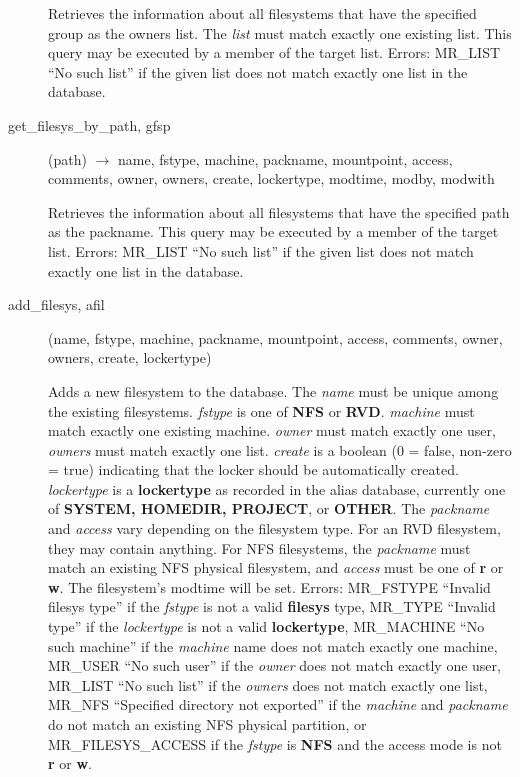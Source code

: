 \documentclass{article}
\begin{document}
\begin{description}
Retrieves the information about all filesystems that have the
specified group as the owners list.  The {\em list} must match exactly
one existing list.  This query may be executed by a member of the
target list.  Errors: MR\_LIST ``No such list'' if the given list does
not match exactly one list in the database.

\item[get\_filesys\_by\_path, gfsp](path) $\rightarrow$ name, fstype,
machine, packname, mountpoint, access, comments, owner, owners,
create, lockertype, modtime, modby, modwith

Retrieves the information about all filesystems that have the
specified path as the packname.  This query may be executed by a
member of the target list.  Errors: MR\_LIST ``No such list'' if the
given list does not match exactly one list in the database.

\item[add\_filesys, afil](name, fstype, machine, packname, mountpoint,
access, comments, owner, owners, create, lockertype)

Adds a new filesystem to the database.  The {\em name} must be unique
among the existing filesystems.  {\em fstype} is one of {\bf NFS} or
{\bf RVD}.  {\em machine} must match exactly one existing machine.
{\em owner} must match exactly one user, {\em owners} must match exactly
one list.  {\em create} is a boolean (0 = false, non-zero = true)
indicating that the locker should be automatically created.
{\em lockertype} is a {\bf lockertype} as recorded in the alias database,
currently one of {\bf SYSTEM, HOMEDIR, PROJECT}, or {\bf OTHER}.  The
{\em packname} and {\em access} vary depending on the filesystem type.
For an RVD filesystem, they may contain anything.  For NFS
filesystems, the {\em packname} must match an existing NFS physical
filesystem, and {\em access} must be one of {\bf r} or {\bf w}.  The
filesystem's modtime will be set.  Errors: MR\_FSTYPE ``Invalid filesys
type'' if the {\em fstype} is not a valid {\bf filesys} type, MR\_TYPE
``Invalid type'' if the {\em lockertype} is not a valid {\bf lockertype},
MR\_MACHINE ``No such machine'' if the {\em machine} name does not match
exactly one machine, MR\_USER ``No such user'' if the {\em owner} does not
match exactly one user, MR\_LIST ``No such list'' if the {\em owners} does
not match exactly one list, MR\_NFS ``Specified directory not exported''
if the {\em machine} and {\em packname} do not match an existing NFS
physical partition, or MR\_FILESYS\_ACCESS if the {\em fstype} is {\bf NFS}
and the access mode is not {\bf r} or {\bf w}.


\end{description}
\end{document}
